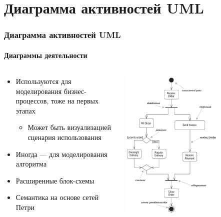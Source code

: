 \documentclass{../cscslides}
\begin{document}
    \section{Диаграмма активностей UML}

    \begin{frame}
        \frametitle{Диаграмма активностей UML}
        \framesubtitle{Диаграммы деятельности}
        \begin{columns}
            \begin{column}{0.5\textwidth}
                \begin{itemize}
                    \item Используются для моделирования бизнес-процессов, тоже на первых этапах
                    \begin{itemize}
                        \item Может быть визуализацией сценария использования
                    \end{itemize}
                    \item Иногда --- для моделирования алгоритма
                    \item Расширенные блок-схемы
                    \item Семантика на основе сетей Петри
                \end{itemize}
            \end{column}
            \begin{column}{0.5\textwidth}
                \begin{center}
                    \includegraphics[width=0.7\textwidth]{activityDiagram.png}
                \end{center}
            \end{column}
        \end{columns}
    \end{frame}
\end{document}
